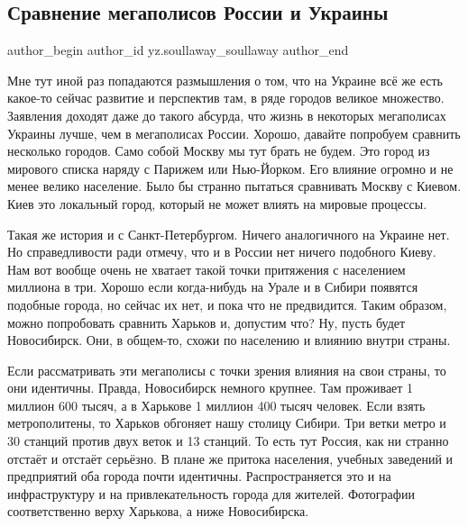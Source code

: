  
 
 
 
 
 
\subsection{Сравнение мегаполисов России и Украины}
\label{sec:28_11_2021.yz.soullaway_soullaway.1.megapolisy_sravnenie}
 
\ifcmt
 author_begin
   author_id yz.soullaway_soullaway
 author_end
\fi

Мне тут иной раз попадаются размышления о том, что на Украине всё же есть
какое-то сейчас развитие и перспектив там, в ряде городов великое множество.
Заявления доходят даже до такого абсурда, что жизнь в некоторых мегаполисах
Украины лучше, чем в мегаполисах России. Хорошо, давайте попробуем сравнить
несколько городов. Само собой Москву мы тут брать не будем. Это город из
мирового списка наряду с Парижем или Нью-Йорком. Его влияние огромно и не менее
велико население. Было бы странно пытаться сравнивать Москву с Киевом. Киев это
локальный город, который не может влиять на мировые процессы.

Такая же история и с Санкт-Петербургом. Ничего аналогичного на Украине нет. Но
справедливости ради отмечу, что и в России нет ничего подобного Киеву. Нам вот
вообще очень не хватает такой точки притяжения с населением миллиона в три.
Хорошо если когда-нибудь на Урале и в Сибири появятся подобные города, но
сейчас их нет, и пока что не предвидится. Таким образом, можно попробовать
сравнить Харьков и, допустим что? Ну, пусть будет Новосибирск. Они, в общем-то,
схожи по населению и влиянию внутри страны.

Если рассматривать эти мегаполисы с точки зрения влияния на свои страны, то они
идентичны. Правда, Новосибирск немного крупнее. Там проживает 1 миллион 600
тысяч, а в Харькове 1 миллион 400 тысяч человек. Если взять метрополитены, то
Харьков обгоняет нашу столицу Сибири. Три ветки метро и 30 станций против двух
веток и 13 станций. То есть тут Россия, как ни странно отстаёт и отстаёт
серьёзно. В плане же притока населения, учебных заведений и предприятий оба
города почти идентичны. Распространяется это и на инфраструктуру и на
привлекательность города для жителей. Фотографии соответственно верху Харькова,
а ниже Новосибирска.

